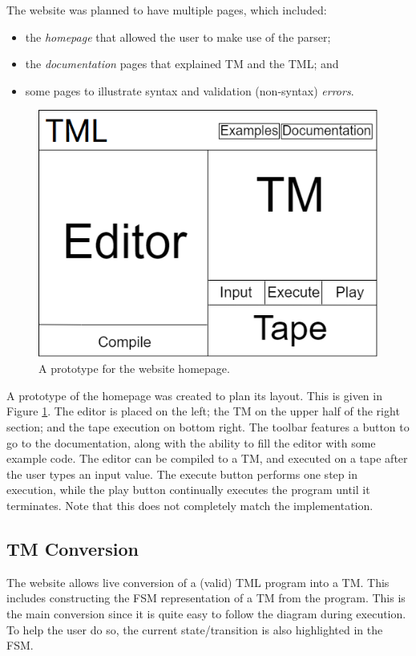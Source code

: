 The website was planned to have multiple pages, which included:
\begin{itemize}
    \item the \emph{homepage} that allowed the user to make use of the parser;
    \item the \emph{documentation} pages that explained TM and the TML; and
    \item some pages to illustrate syntax and validation (non-syntax) \emph{errors}.
\end{itemize}

\begin{figure}[htb]
    \centering
    \includegraphics{images/Index webpage prototype.png}
    \caption{A prototype for the website homepage.}
    \label{fig:homepage_prototype}
\end{figure}

A prototype of the homepage was created to plan its layout. This is given in Figure \ref{fig:homepage_prototype}. The editor is placed on the left; the TM on the upper half of the right section; and the tape execution on bottom right. The toolbar features a button to go to the documentation, along with the ability to fill the editor with some example code. The editor can be compiled to a TM, and executed on a tape after the user types an input value. The execute button performs one step in execution, while the play button continually executes the program until it terminates. Note that this does not completely match the implementation.

\subsection{TM Conversion}
The website allows live conversion of a (valid) TML program into a TM. This includes constructing the FSM representation of a TM from the program. This is the main conversion since it is quite easy to follow the diagram during execution. To help the user do so, the current state/transition is also highlighted in the FSM.

